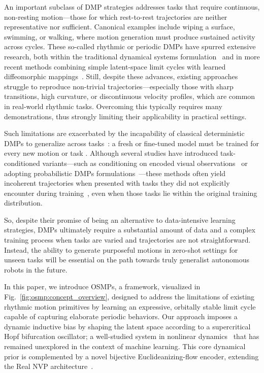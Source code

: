 An important subclass of \gls{DMP} strategies addresses tasks that require continuous, non-resting motion—those for which rest-to-rest trajectories are neither representative nor sufficient. Canonical examples include wiping a surface, swimming, or walking, where motion generation must produce sustained activity across cycles. These so-called rhythmic or periodic \glspl{DMP} have spurred extensive research, both within the traditional dynamical systems formulation~\citep{ijspeert2002learning,kober2009learning,ijspeert2013dynamical,wensing2017sparse,kramberger2018passivity,saveriano2023dynamic,abu2024learning,hu2024fusion,nah2025combining} and in more recent methods combining simple latent-space limit cycles with learned diffeomorphic mappings~\citep{urain2020imitationflow,khadivar2021learning,zhi2024teaching}. Still, despite these advances, existing approaches struggle to reproduce non-trivial trajectories—especially those with sharp transitions, high curvature, or discontinuous velocity profiles, which are common in real-world rhythmic tasks. Overcoming this typically requires many demonstrations, thus strongly limiting their applicability in practical settings. 

Such limitations are exacerbated by the incapability of classical deterministic \glspl{DMP} to generalize across tasks~\citep{jaquier2025transfer}: a fresh or fine-tuned model must be trained for every new motion or task \citep{saveriano2023dynamic}. Although several studies have introduced task-conditioned variants—such as conditioning on encoded visual observations~\citep{bahl2020neural, mohammadi2024extended} or adopting probabilistic \glspl{DMP} formulations~\citep{seker2019conditional, saveriano2023dynamic, pekmezci2024coupled}—these methods often yield incoherent trajectories when presented with tasks they did not explicitly encounter during training~\citep{jaquier2025transfer}, even when those tasks lie within the original training distribution. 

So, despite their promise of being an alternative to data-intensive learning strategies, \glspl{DMP} ultimately require a substantial amount of data and a complex training process when tasks are varied and trajectories are not straightforward. Instead, the ability to generate purposeful motions in zero-shot settings for unseen tasks will be essential on the path towards truly generalist autonomous robots in the future.

In this paper, we introduce \glspl{OSMP}, a framework, visualized in Fig.~\ref{fig:osmp:concept_overview}, designed to address the limitations of existing rhythmic motion primitives by learning an expressive, orbitally stable limit cycle capable of capturing elaborate periodic behaviors. Our approach imposes a dynamic inductive bias by shaping the latent space according to a supercritical Hopf bifurcation oscillator; a well-studied system in nonlinear dynamics~\citep{strogatz2018nonlinear, khadivar2021learning, nah2025combining} that has remained unexplored in the context of machine learning. This core dynamical prior is complemented by a novel bijective Euclideanizing-flow encoder, extending the Real NVP architecture~\citep{rana2020euclideanizing, dinh2017density}.

